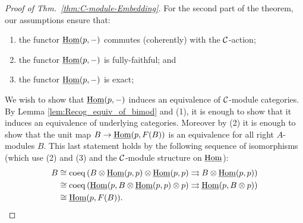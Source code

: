 \documentclass{amsart}
\begin{document}
\begin{proof}[Proof of Thm.~\ref{thm:C-module-Embedding}]
For the second part of the theorem, our assumptions ensure that:
\begin{enumerate}
	\item the functor $\operatorname{\underline{Hom}}(p, -)$ commutes (coherently) with the $\mathcal C$-action; 
	\item the functor $\operatorname{\underline{Hom}}(p, -)$ is fully-faithful; and 
	\item the functor $\operatorname{\underline{Hom}}(p, -)$ is exact; 
\end{enumerate}
We wish to show that $\operatorname{\underline{Hom}}(p, -)$ induces an equivalence of $\mathcal C$-module categories. By Lemma \ref{lem:Recog_equiv_of_bimod} and (1), it is enough to show that it induces an equivalence of underlying categories. Moreover by (2) it is enough to show that the unit map $B \to \operatorname{\underline{Hom}}(p, F(B))$ is an equivalence for all right $A$-modules $B$. This last statement holds by the following sequence of isomorphisms (which use (2) and (3) and the $\mathcal C$-module structure on $\operatorname{\underline{Hom}}$):
\begin{align*}
	B & \cong \operatorname{coeq} \left( B \otimes \operatorname{\underline{Hom}}(p,p) \otimes \operatorname{\underline{Hom}}(p,p) \rightrightarrows B \otimes \operatorname{\underline{Hom}}(p,p) \right)\\
	& \cong \operatorname{coeq} \left(\operatorname{\underline{Hom}}(p,B  \otimes \operatorname{\underline{Hom}}(p,p) \otimes p) \rightrightarrows \operatorname{\underline{Hom}}(p,B \otimes p) \right)\\
	& \cong \operatorname{\underline{Hom}}(p, F(B)). \qedhere
\end{align*}	
\end{proof}

\end{document}
